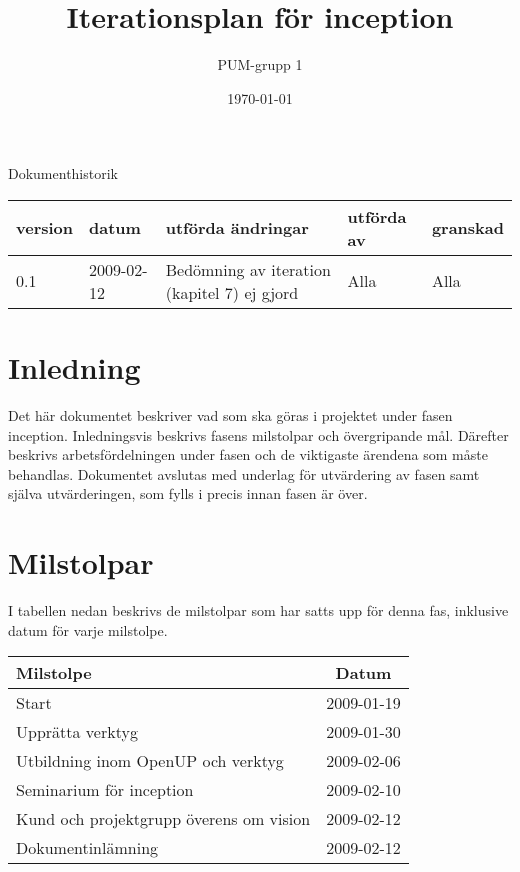 

\ifpdf
\else
\fi

\title{Iterationsplan för inception}
\author{PUM-grupp 1}
\date{\today}



\maketitle\thispagestyle{empty}
\newpage

{\centering \Large{Dokumenthistorik\\}}

\vspace{10pt}
\begin{tabularx}{\textwidth}{ |l|l|X|l|l| }
  \hline
    \textbf{version} & \textbf{datum} & \textbf{utförda ändringar} & \textbf{utförda av} & \textbf{granskad} \\
	\hline 
  0.1 & 2009-02-12 &  Bedömning av iteration (kapitel 7) ej gjord  & Alla & Alla   \\
  \hline
\end{tabularx}

\newpage

\setcounter{tocdepth}{2}
\tableofcontents
\newpage

\section{Inledning}
Det här dokumentet beskriver vad som ska göras i projektet under fasen inception. Inledningsvis beskrivs fasens milstolpar och övergripande mål. Därefter beskrivs arbetsfördelningen under fasen och de viktigaste ärendena som måste behandlas. Dokumentet avslutas med underlag för utvärdering av fasen samt själva utvärderingen, som fylls i precis innan fasen är över.

\section{Milstolpar}
I tabellen nedan beskrivs de milstolpar som har satts upp för denna fas, inklusive datum för varje milstolpe.

\begin{center}
	\begin{tabular}{| l | c |}
	\hline \textbf{Milstolpe} & \textbf{Datum} \\
	\hline Start & 2009-01-19 \\
	\hline Upprätta verktyg & 2009-01-30 \\
	\hline Utbildning inom OpenUP och verktyg & 2009-02-06 \\
	\hline Seminarium för inception & 2009-02-10 \\
	\hline Kund och projektgrupp överens om vision & 2009-02-12 \\
	\hline Dokumentinlämning & 2009-02-12 \\
	\hline
	\end{tabular}
\end{center}

